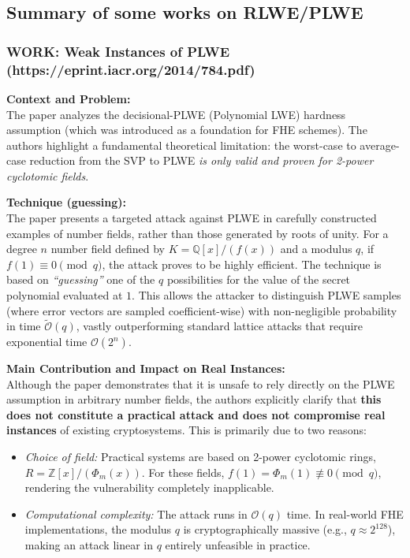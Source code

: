\subsection{Summary of some works on RLWE/PLWE}\label{appendix:summary}

\subsubsection{WORK: Weak Instances of PLWE (https://eprint.iacr.org/2014/784.pdf)}

\textbf{Context and Problem:} \\
The paper analyzes the decisional-PLWE (Polynomial LWE) hardness assumption (which was introduced as a foundation for FHE schemes). The authors highlight a fundamental theoretical limitation: the worst-case to average-case reduction from the SVP to PLWE \emph{is only valid and proven for 2-power cyclotomic fields}. %

\textbf{Technique (guessing):} \\
The paper presents a targeted attack against PLWE in carefully constructed examples of number fields, rather than those generated by roots of unity. For a degree $n$ number field defined by $K = \mathbb{Q}[x]/(f(x))$ and a modulus $q$, if $f(1) \equiv 0 \pmod q$, the attack proves to be highly efficient. The technique is based on \emph{``guessing''} one of the $q$ possibilities for the value of the secret polynomial evaluated at $1$. This allows the attacker to distinguish PLWE samples (where error vectors are sampled coefficient-wise) with non-negligible probability in time $\tilde{\mathcal{O}}(q)$, vastly outperforming standard lattice attacks that require exponential time $\mathcal{O}(2^n)$.

\textbf{Main Contribution and Impact on Real Instances:} \\
Although the paper demonstrates that it is unsafe to rely directly on the PLWE assumption in arbitrary number fields, the authors explicitly clarify that \textbf{this does not constitute a practical attack and does not compromise real instances} of existing cryptosystems. This is primarily due to two reasons:
\begin{itemize}
    \item \textit{Choice of field:} Practical systems are based on 2-power cyclotomic rings, $R = \mathbb{Z}[x]/(\Phi_m(x))$. For these fields, $f(1) = \Phi_m(1) \not\equiv 0 \pmod q$, rendering the vulnerability completely inapplicable.
    \item \textit{Computational complexity:} The attack runs in $\mathcal{O}(q)$ time. In real-world FHE implementations, the modulus $q$ is cryptographically massive (e.g., $q \approx 2^{128}$), making an attack linear in $q$ entirely unfeasible in practice.
\end{itemize}



